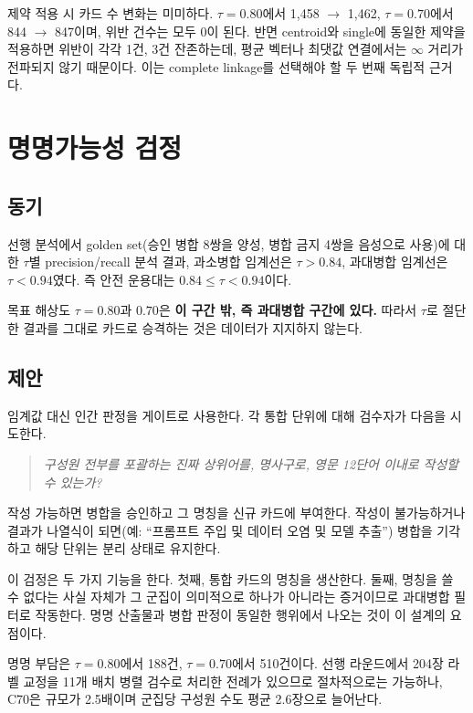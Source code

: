 \documentclass[11pt,a4paper]{article}
\begin{document}
제약 적용 시 카드 수 변화는 미미하다. $\tau=0.80$에서 1{,}458 $\rightarrow$ 1{,}462, $\tau=0.70$에서 844 $\rightarrow$ 847이며, 위반 건수는 모두 0이 된다. 반면 centroid와 single에 동일한 제약을 적용하면 위반이 각각 1건, 3건 잔존하는데, 평균 벡터나 최댓값 연결에서는 $\infty$ 거리가 전파되지 않기 때문이다. 이는 complete linkage를 선택해야 할 두 번째 독립적 근거다.

\section{명명가능성 검정}

\subsection{동기}

선행 분석에서 golden set(승인 병합 8쌍을 양성, 병합 금지 4쌍을 음성으로 사용)에 대한 $\tau$별 precision/recall 분석 결과, 과소병합 임계선은 $\tau>0.84$, 과대병합 임계선은 $\tau<0.94$였다. 즉 안전 운용대는 $0.84 \leq \tau < 0.94$이다.

목표 해상도 $\tau=0.80$과 $0.70$은 \textbf{이 구간 밖, 즉 과대병합 구간에 있다.} 따라서 $\tau$로 절단한 결과를 그대로 카드로 승격하는 것은 데이터가 지지하지 않는다.

\subsection{제안}

임계값 대신 인간 판정을 게이트로 사용한다. 각 통합 단위에 대해 검수자가 다음을 시도한다.

\begin{quote}
\textit{구성원 전부를 포괄하는 진짜 상위어를, 명사구로, 영문 12단어 이내로 작성할 수 있는가?}
\end{quote}

작성 가능하면 병합을 승인하고 그 명칭을 신규 카드에 부여한다. 작성이 불가능하거나 결과가 나열식이 되면(예: ``프롬프트 주입 및 데이터 오염 및 모델 추출'') 병합을 기각하고 해당 단위는 분리 상태로 유지한다.

이 검정은 두 가지 기능을 한다. 첫째, 통합 카드의 명칭을 생산한다. 둘째, 명칭을 쓸 수 없다는 사실 자체가 그 군집이 의미적으로 하나가 아니라는 증거이므로 과대병합 필터로 작동한다. 명명 산출물과 병합 판정이 동일한 행위에서 나오는 것이 이 설계의 요점이다.

명명 부담은 $\tau=0.80$에서 188건, $\tau=0.70$에서 510건이다. 선행 라운드에서 204장 라벨 교정을 11개 배치 병렬 검수로 처리한 전례가 있으므로 절차적으로는 가능하나, C70은 규모가 2.5배이며 군집당 구성원 수도 평균 2.6장으로 늘어난다.
\end{document}
